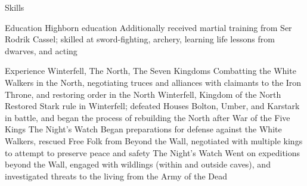 \documentclass[]{rajatsresume}
\begin{document}



\begin{subheader}
\end{subheader}

\begin{topic}{Skills}
\end{topic}

\begin{topic}{Education}
    {Highborn education}
    {Additionally received martial training from Ser Rodrik Cassel; skilled
    at sword-fighting, archery, learning life lessons from dwarves, and acting}
\end{topic}

\begin{topic}{Experience}
    {Winterfell, The North, The Seven Kingdoms}
    {Combatting the White Walkers in the North, negotiating truces and
    alliances with claimants to the Iron Throne, and restoring order in the
    North}
    {Winterfell, Kingdom of the North}
    {Restored Stark rule in Winterfell; defeated Houses Bolton, Umber, and
    Karstark in battle, and began the process of rebuilding the North after
    War of the Five Kings}
    {The Night's Watch}
    {Began preparations for defense against the White Walkers, rescued
    Free Folk from Beyond the Wall, negotiated with multiple kings to
    attempt to preserve peace and safety}
    {The Night's Watch}
    {Went on expeditions beyond the Wall, engaged with wildlings (within
    and outside caves), and investigated threats to the living from the Army
    of the Dead}
\end{topic}
\end{document}
